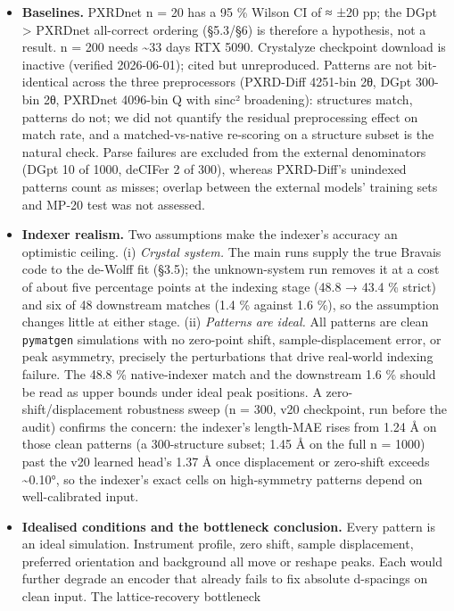 \documentclass[
  11pt,
]{article}
\begin{document}
\begin{itemize}
\item
  \textbf{Baselines.} PXRDnet n = 20 has a 95 \% Wilson CI of ≈ ±20 pp;
  the DGpt \textgreater{} PXRDnet all-correct ordering (§5.3/§6) is
  therefore a hypothesis, not a result. n = 200 needs \textasciitilde33
  days RTX 5090. Crystalyze checkpoint download is inactive (verified
  2026-06-01); cited but unreproduced. Patterns are not bit-identical
  across the three preprocessors (PXRD-Diff 4251-bin 2θ, DGpt 300-bin
  2θ, PXRDnet 4096-bin Q with sinc² broadening): structures match,
  patterns do not; we did not quantify the residual preprocessing effect
  on match rate, and a matched-vs-native re-scoring on a structure
  subset is the natural check. Parse failures are excluded from the
  external denominators (DGpt 10 of 1000, deCIFer 2 of 300), whereas
  PXRD-Diff's unindexed patterns count as misses; overlap between the
  external models' training sets and MP-20 test was not assessed.
\item
  \textbf{Indexer realism.} Two assumptions make the indexer's accuracy
  an optimistic ceiling. (i) \emph{Crystal system.} The main runs supply
  the true Bravais code to the de-Wolff fit (§3.5); the unknown-system
  run removes it at a cost of about five percentage points at the
  indexing stage (48.8 → 43.4 \% strict) and six of 48 downstream
  matches (1.4 \% against 1.6 \%), so the assumption changes little at
  either stage. (ii) \emph{Patterns are ideal.} All patterns are clean
  \texttt{pymatgen} simulations with no zero-point shift,
  sample-displacement error, or peak asymmetry, precisely the
  perturbations that drive real-world indexing failure. The 48.8 \%
  native-indexer match and the downstream 1.6 \% should be read as upper
  bounds under ideal peak positions. A zero-shift/displacement
  robustness sweep (n = 300, v20 checkpoint, run before the audit)
  confirms the concern: the indexer's length-MAE rises from 1.24 Å on
  those clean patterns (a 300-structure subset; 1.45 Å on the full n =
  1000) past the v20 learned head's 1.37 Å once displacement or
  zero-shift exceeds \textasciitilde0.10°, so the indexer's exact cells
  on high-symmetry patterns depend on well-calibrated input.
\item
  \textbf{Idealised conditions and the bottleneck conclusion.} Every
  pattern is an ideal simulation. Instrument profile, zero shift, sample
  displacement, preferred orientation and background all move or reshape
  peaks. Each would further degrade an encoder that already fails to fix
  absolute d-spacings on clean input. The lattice-recovery bottleneck

\end{itemize}
\end{document}
